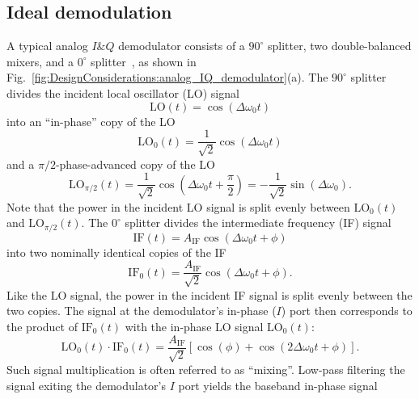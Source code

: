 \subsection{Ideal demodulation}
\label{sec:DesignConsiderations:demodulation:ideal}
A typical analog $I\&Q$ demodulator consists of
a $90^{\circ}$ splitter,
two double-balanced mixers, and
a $0^{\circ}$ splitter~\cite{minicircuits_modulators}, as shown in
Fig.~\ref{fig:DesignConsiderations:analog_IQ_demodulator}(a).
The $90^{\circ}$ splitter divides the incident local oscillator (LO) signal
\begin{equation}
  \text{LO}(t) = \cos(\Delta\omega_0 t)
\end{equation}
into an ``in-phase'' copy of the LO
\begin{equation}
  \text{LO}_0(t)
  =
  \frac{1}{\sqrt{2}} \cos(\Delta\omega_0 t)
\end{equation}
and a $\pi / 2$-phase-advanced copy of the LO
\begin{equation}
  \text{LO}_{\pi / 2}(t)
  =
  \frac{1}{\sqrt{2}} \cos\left( \Delta\omega_0 t + \frac{\pi}{2} \right)
  =
  - \frac{1}{\sqrt{2}} \sin(\Delta\omega_0).
\end{equation}
Note that the power in the incident LO signal
is split evenly between $\text{LO}_0(t)$ and $\text{LO}_{\pi / 2}(t)$.
The $0^{\circ}$ splitter divides the intermediate frequency (IF) signal
\begin{equation}
  \text{IF}(t) = A_{\text{IF}} \cos(\Delta\omega_0 t + \phi)
  \label{eq:DesignConsiderations:IF_perfect_sinusoid}
\end{equation}
into two nominally identical copies of the IF
\begin{equation}
  \text{IF}_0(t)
  =
  \frac{A_{\text{IF}}}{\sqrt{2}} \cos(\Delta\omega_0 t + \phi).
\end{equation}
Like the LO signal, the power in the incident IF signal
is split evenly between the two copies.
The signal at the demodulator's in-phase ($I$) port
then corresponds to the product of
$\text{IF}_0(t)$ with the in-phase LO signal $\text{LO}_0(t)$:
\graffito{\textcolor{red}{incorrect amplitude}}
\begin{equation}
  \text{LO}_0(t) \cdot \text{IF}_0(t)
  =
  \frac{A_{\text{IF}}}{\sqrt{2}}
  \left[
    \cos(\phi) + \cos(2 \Delta\omega_0 t + \phi)
  \right].
\end{equation}
Such signal multiplication is often referred to as ``mixing''.
Low-pass filtering the signal exiting the demodulator's $I$ port
yields the baseband in-phase signal

